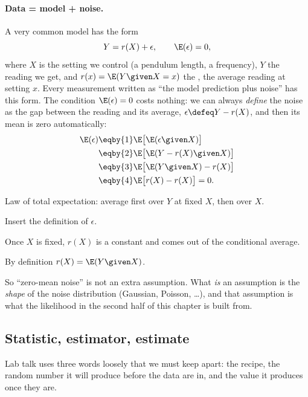 \paragraph{Data = model + noise.}
A very common model has the form
\begin{equation}
  Y=r(X)+\epsilon,\qquad \E(\epsilon)=0,
  \label{3a:eq:regression}
\end{equation}
where $X$ is the setting we control (a pendulum length, a frequency), $Y$ the
reading we get, and $r(x)=\E(Y\given X=x)$ the ,
the average reading at setting $x$. Every measurement written as ``the model
prediction plus noise'' has this form. The condition $\E(\epsilon)=0$ costs
nothing: we can always \emph{define} the noise as the gap between the reading
and its average, $\epsilon\defeq Y-r(X)$, and then its mean is zero
automatically:
\begin{align}
  \E(\epsilon)
  &\eqby{1} \E\bigl[\E(\epsilon\given X)\bigr] \nonumber\\
  &\eqby{2} \E\bigl[\E(Y-r(X)\given X)\bigr] \nonumber\\
  &\eqby{3} \E\bigl[\E(Y\given X)-r(X)\bigr] \nonumber\\
  &\eqby{4} \E\bigl[r(X)-r(X)\bigr]=0 .
  \label{3a:eq:noise-mean-zero}
\end{align}
\begin{explain}
  \item Law of total expectation: average first over $Y$ at fixed $X$, then over $X$.
  \item Insert the definition of $\epsilon$.
  \item Once $X$ is fixed, $r(X)$ is a constant and comes out of the conditional average.
  \item By definition $r(X)=\E(Y\given X)$.
\end{explain}
So ``zero-mean noise'' is not an extra assumption. What \emph{is} an
assumption is the \emph{shape} of the noise distribution (Gaussian, Poisson,
\dots), and that assumption is what the likelihood in the second half of this
chapter is built from.

\subsection{Statistic, estimator, estimate}
\label{3a:sec:estimator}

Lab talk uses three words loosely that we must keep apart: the recipe, the
random number it will produce before the data are in, and the value it
produces once they are.

